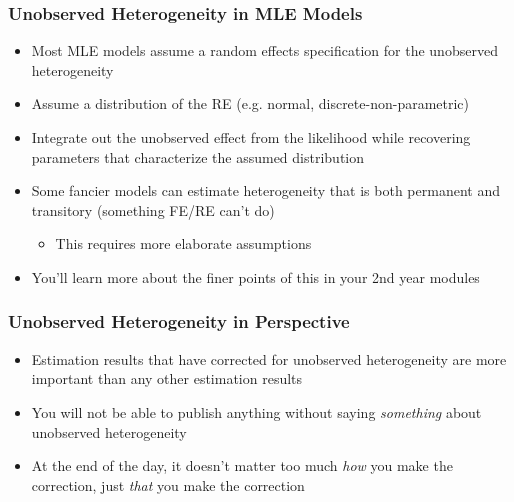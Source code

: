 \documentclass[english,xcolor=dvipsnames]{beamer}
\newcommand{\bi}{\begin{itemize}}
\newcommand{\ei}{\end{itemize}}
\begin{document}
\begin{frame}
\frametitle{Unobserved Heterogeneity in MLE Models}
   \bi 
   \item Most MLE models assume a random effects specification for the unobserved heterogeneity
   \item Assume a distribution of the RE (e.g. normal, discrete-non-parametric) 
   \item Integrate out the unobserved effect from the likelihood while recovering parameters that characterize the assumed distribution
   \item Some fancier models can estimate heterogeneity that is both permanent and transitory (something FE/RE can't do)
      \bi 
      \item This requires more elaborate assumptions
      \ei
   \item You'll learn more about the finer points of this in your 2nd year modules
   \ei
\end{frame}

\begin{frame}
\frametitle{Unobserved Heterogeneity in Perspective}
   \bi 
   \item Estimation results that have corrected for unobserved heterogeneity are more important than any other estimation results
   \item You will not be able to publish anything without saying  \emph{something} about unobserved heterogeneity
   \item At the end of the day, it doesn't matter too much  \emph{how} you make the correction, just  \emph{that} you make the correction
   \ei
\end{frame}
\end{document}
